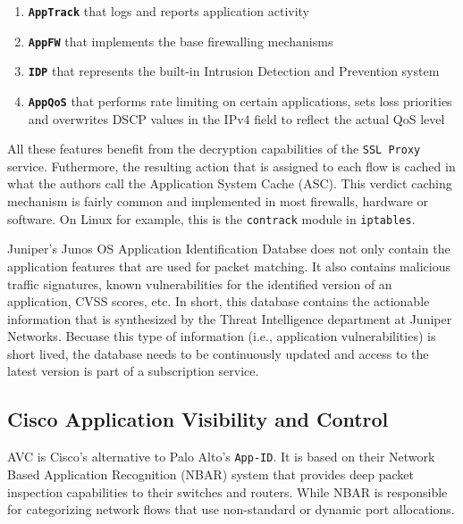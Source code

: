 \begin{enumerate}
    \item \textbf{\texttt{AppTrack}} that logs and reports application activity
    \item \textbf{\texttt{AppFW}} that implements the base firewalling mechanisms
    \item \textbf{\texttt{IDP}} that represents the built-in Intrusion Detection
          and Prevention system
    \item \textbf{\texttt{AppQoS}} that performs rate limiting on certain
           applications, sets loss priorities and overwrites DSCP values in the
           IPv4 field to reflect the actual QoS level
\end{enumerate}

All these features benefit from the decryption capabilities of the
\texttt{SSL Proxy} service. Futhermore, the resulting action that is assigned to
each flow is cached in what the authors call the Application System Cache (ASC).
This verdict caching mechanism is fairly common and implemented in most firewalls,
hardware or software. On Linux for example, this is the \texttt{contrack} module
in \texttt{iptables}.

Juniper's Junos OS Application Identification Databse does not only contain the
application features that are used for packet matching. It also contains
malicious traffic signatures, known vulnerabilities for the identified version
of an application, CVSS scores, etc. In short, this database contains the
actionable information that is synthesized by the Threat Intelligence department
at Juniper Networks. Becuase this type of information (i.e., application
vulnerabilities) is short lived, the database needs to be continuously updated
and access to the latest version is part of a subscription service.

\subsection{Cisco Application Visibility and Control}

AVC is Cisco's alternative to Palo Alto's \texttt{App-ID}. It is based on their
Network Based Application Recognition (NBAR) system that provides deep packet
inspection capabilities to their switches and routers. While NBAR is responsible
for categorizing network flows that use non-standard or dynamic port allocations.

